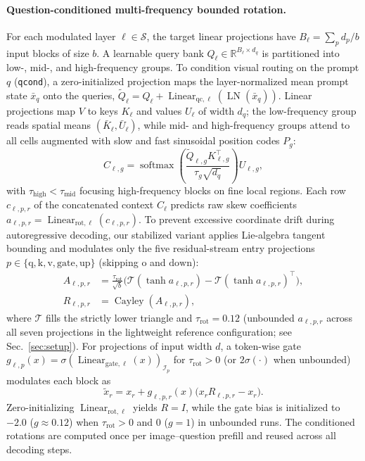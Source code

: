 \paragraph{Question-conditioned multi-frequency bounded rotation.}
For each modulated layer $\ell\in\mathcal{S}$, the target linear projections
have $B_\ell{=}\sum_p d_p/b$ input blocks of size $b$. A learnable query bank
$Q_\ell\in\mathbb{R}^{B_\ell\times d_q}$ is partitioned into low-, mid-, and
high-frequency groups. To condition visual routing on the prompt $q$
(\texttt{qcond}), a zero-initialized projection maps the layer-normalized mean
prompt state $\bar{x}_q$ onto the queries,
$\widetilde{Q}_\ell=Q_\ell+\operatorname{Linear}_{\mathrm{qc},\ell}(\operatorname{LN}(\bar{x}_q))$.
Linear projections map $V$ to keys $K_\ell$ and values $U_\ell$ of width $d_q$;
the low-frequency group reads spatial means $(\bar{K}_\ell,\bar{U}_\ell)$, while
mid- and high-frequency groups attend to all cells augmented with slow and fast
sinusoidal position codes $P_g$:
\begin{equation}
C_{\ell,g}=\operatorname{softmax}\!\left(
\frac{\widetilde{Q}_{\ell,g}K_{\ell,g}^\top}{\tau_g\sqrt{d_q}}
\right)U_{\ell,g},
\label{eq:frequency_context}
\end{equation}
with $\tau_{\mathrm{high}}<\tau_{\mathrm{mid}}$ focusing high-frequency blocks
on fine local regions. Each row $c_{\ell,p,r}$ of the concatenated context
$C_\ell$ predicts raw skew coefficients
$a_{\ell,p,r}=\operatorname{Linear}_{\mathrm{rot},\ell}(c_{\ell,p,r})$. To
prevent excessive coordinate drift during autoregressive decoding, our stabilized
variant applies Lie-algebra tangent bounding and modulates only the five
residual-stream entry projections $p\in\{\mathrm{q,k,v,gate,up}\}$ (skipping
$\mathrm{o}$ and $\mathrm{down}$):
\begin{equation}
\begin{aligned}
A_{\ell,p,r} &= \frac{\tau_{\mathrm{rot}}}{\sqrt{b}}
\bigl(\mathcal{T}(\tanh a_{\ell,p,r})-\mathcal{T}(\tanh a_{\ell,p,r})^\top\bigr), \\
R_{\ell,p,r} &= \operatorname{Cayley}(A_{\ell,p,r}),
\end{aligned}
\label{eq:cayley}
\end{equation}
where $\mathcal{T}$ fills the strictly lower triangle and $\tau_{\mathrm{rot}}{=}0.12$
(unbounded $a_{\ell,p,r}$ across all seven projections in the lightweight
reference configuration; see Sec.~\ref{sec:setup}). For projections of input
width $d$, a token-wise gate
$g_{\ell,p}(x)=\sigma(\operatorname{Linear}_{\mathrm{gate},\ell}(x))_{\mathcal{I}_p}$
for $\tau_{\mathrm{rot}}{>}0$ (or $2\sigma(\cdot)$ when unbounded) modulates each
block as
\begin{equation}
\widetilde{x}_r=x_r+g_{\ell,p,r}(x)\bigl(x_rR_{\ell,p,r}-x_r\bigr).
\label{eq:gate}
\end{equation}
Zero-initializing $\operatorname{Linear}_{\mathrm{rot},\ell}$ yields $R{=}I$,
while the gate bias is initialized to $-2.0$ ($g{\approx}0.12$) when
$\tau_{\mathrm{rot}}{>}0$ and $0$ ($g{=}1$) in unbounded runs. The conditioned
rotations are computed once per image--question prefill and reused across all
decoding steps.


